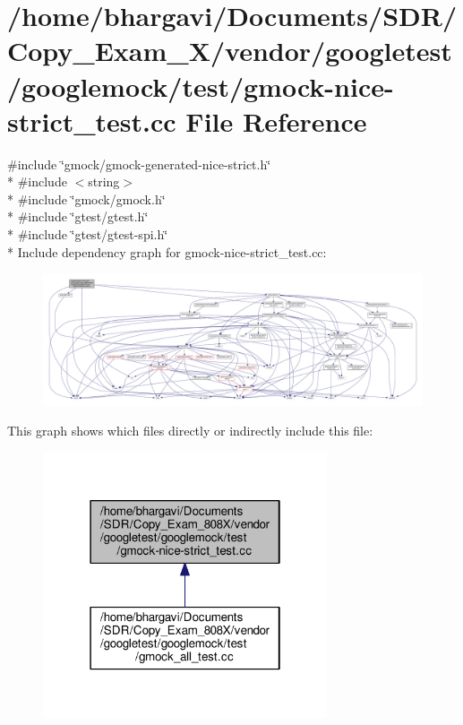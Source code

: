 \hypertarget{gmock-nice-strict__test_8cc}{}\section{/home/bhargavi/\+Documents/\+S\+D\+R/\+Copy\+\_\+\+Exam\+\_\+X/vendor/googletest/googlemock/test/gmock-\/nice-\/strict\+\_\+test.cc File Reference}
\label{gmock-nice-strict__test_8cc}
{\ttfamily \#include \char`\"{}gmock/gmock-\/generated-\/nice-\/strict.\+h\char`\"{}}\\*
{\ttfamily \#include $<$string$>$}\\*
{\ttfamily \#include \char`\"{}gmock/gmock.\+h\char`\"{}}\\*
{\ttfamily \#include \char`\"{}gtest/gtest.\+h\char`\"{}}\\*
{\ttfamily \#include \char`\"{}gtest/gtest-\/spi.\+h\char`\"{}}\\*
Include dependency graph for gmock-\/nice-\/strict\+\_\+test.cc\+:
\nopagebreak
\begin{figure}[H]
\begin{center}
\leavevmode
\includegraphics[width=350pt]{gmock-nice-strict__test_8cc__incl}
\end{center}
\end{figure}
This graph shows which files directly or indirectly include this file\+:
\nopagebreak
\begin{figure}[H]
\begin{center}
\leavevmode
\includegraphics[width=238pt]{gmock-nice-strict__test_8cc__dep__incl}
\end{center}
\end{figure}
